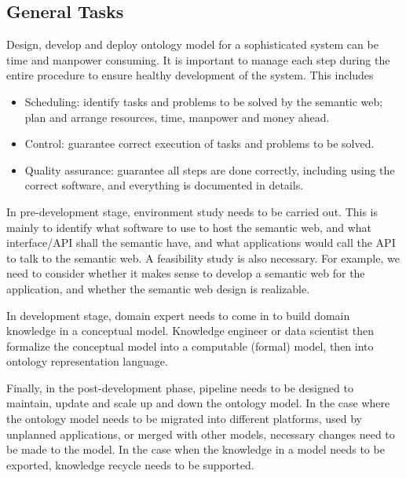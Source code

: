 \subsection{General Tasks}

Design, develop and deploy ontology model for a sophisticated system can be time and manpower consuming. It is important to manage each step during the entire procedure to ensure healthy development of the system. This includes
\begin{itemize}
	\item Scheduling: identify tasks and problems to be solved by the semantic web; plan and arrange resources, time, manpower and money ahead.
	\item Control: guarantee correct execution of tasks and problems to be solved.
	\item Quality assurance: guarantee all steps are done correctly, including using the correct software, and everything is documented in details.
\end{itemize}

In pre-development stage, environment study needs to be carried out. This is mainly to identify what software to use to host the semantic web, and what interface/API shall the semantic have, and what applications would call the API to talk to the semantic web. A feasibility study is also necessary. For example, we need to consider whether it makes sense to develop a semantic web for the application, and whether the semantic web design is realizable.

In development stage, domain expert needs to come in to build domain knowledge in a conceptual model. Knowledge engineer or data scientist then formalize the conceptual model into a computable (formal) model, then into ontology representation language.

Finally, in the post-development phase, pipeline needs to be designed to maintain, update and scale up and down the ontology model. In the case where the ontology model needs to be migrated into different platforms, used by unplanned applications, or merged with other models, necessary changes need to be made to the model. In the case when the knowledge in a model needs to be exported, knowledge recycle needs to be supported. 

